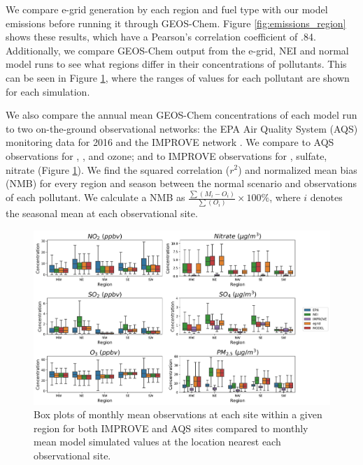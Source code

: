 \documentclass[12]{article}
\begin{document}
We compare e-grid generation by each region and fuel type with our model emissions before running it through GEOS-Chem. 
Figure \ref{fig:emissions_region} shows these results, which have a Pearson's correlation coefficient of .84. Additionally, we compare GEOS-Chem output from the e-grid, NEI and normal model runs to see what regions differ in their concentrations of pollutants. This can be seen in Figure \ref{fig:obs_model}, where the ranges of values for each pollutant are shown for each simulation.

We also compare the annual mean GEOS-Chem concentrations of each model run to two on-the-ground observational networks: the EPA Air Quality System (AQS) monitoring data for 2016 \citep{us_epa_daily_2016} and the IMPROVE network \citep{malm_spatial_1994}. We compare to AQS observations for , ,  and ozone; and to IMPROVE observations for , sulfate, nitrate (Figure \ref{fig:obs_model}). We find the squared correlation ($r^2$) and normalized mean bias (NMB) for every region and season between the normal scenario and observations of each pollutant. We calculate a NMB as $\frac{\sum(M_i - O_i)}{\sum(O_i)} \times 100\%$, where $i$ denotes the seasonal mean at each observational site.


\begin{figure}[h!]
    \centering
    \includegraphics[width=1.\textwidth]{model_validation/Figures/obs_boxplots.png}
    \caption{Box plots of monthly mean observations at each site within a given region for both IMPROVE and AQS sites compared to monthly mean model simulated values at the location nearest each observational site.} 
    \label{fig:obs_model}
\end{figure}
\end{document}
